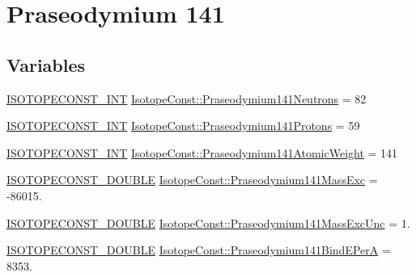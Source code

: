 \hypertarget{group___isotope_const-_praseodymium-_pr141}{}\section{Praseodymium 141}
\label{group___isotope_const-_praseodymium-_pr141}
\subsection*{Variables}
\begin{DoxyCompactItemize}
\item 
\mbox{\hyperlink{group___isotope_const-_macros_ga5f18360b3e99483a35c32d789e62621c}{I\+S\+O\+T\+O\+P\+E\+C\+O\+N\+S\+T\+\_\+\+I\+NT}} \mbox{\hyperlink{group___isotope_const-_praseodymium-_pr141_ga6291513194046ba62fe70d32692a7718}{Isotope\+Const\+::\+Praseodymium141\+Neutrons}} = 82
\item 
\mbox{\hyperlink{group___isotope_const-_macros_ga5f18360b3e99483a35c32d789e62621c}{I\+S\+O\+T\+O\+P\+E\+C\+O\+N\+S\+T\+\_\+\+I\+NT}} \mbox{\hyperlink{group___isotope_const-_praseodymium-_pr141_ga1ad7160162a9d5f2d5c766585204341e}{Isotope\+Const\+::\+Praseodymium141\+Protons}} = 59
\item 
\mbox{\hyperlink{group___isotope_const-_macros_ga5f18360b3e99483a35c32d789e62621c}{I\+S\+O\+T\+O\+P\+E\+C\+O\+N\+S\+T\+\_\+\+I\+NT}} \mbox{\hyperlink{group___isotope_const-_praseodymium-_pr141_ga692a5312ab5a8979f33c315d9263b295}{Isotope\+Const\+::\+Praseodymium141\+Atomic\+Weight}} = 141
\item 
\mbox{\hyperlink{group___isotope_const-_macros_ga8f45a7272ce02c0b4c65c44636ed719a}{I\+S\+O\+T\+O\+P\+E\+C\+O\+N\+S\+T\+\_\+\+D\+O\+U\+B\+LE}} \mbox{\hyperlink{group___isotope_const-_praseodymium-_pr141_gac8ec4c82c1f0694f5b8810b97c8437d4}{Isotope\+Const\+::\+Praseodymium141\+Mass\+Exc}} = -\/86015.
\item 
\mbox{\hyperlink{group___isotope_const-_macros_ga8f45a7272ce02c0b4c65c44636ed719a}{I\+S\+O\+T\+O\+P\+E\+C\+O\+N\+S\+T\+\_\+\+D\+O\+U\+B\+LE}} \mbox{\hyperlink{group___isotope_const-_praseodymium-_pr141_ga59ac3aa2f21373a7de8e9f86f5e692f7}{Isotope\+Const\+::\+Praseodymium141\+Mass\+Exc\+Unc}} = 1.
\item 
\mbox{\hyperlink{group___isotope_const-_macros_ga8f45a7272ce02c0b4c65c44636ed719a}{I\+S\+O\+T\+O\+P\+E\+C\+O\+N\+S\+T\+\_\+\+D\+O\+U\+B\+LE}} \mbox{\hyperlink{group___isotope_const-_praseodymium-_pr141_gac6533f2284ca5be164045a376be12529}{Isotope\+Const\+::\+Praseodymium141\+Bind\+E\+PerA}} = 8353.

\end{DoxyCompactItemize}
